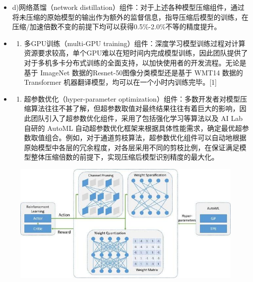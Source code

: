 \begin{itemize}
\begin{enumerate}
  \end{enumerate}
\item
  d)网络蒸馏（network
  distillation）组件：对于上述各种模型压缩组件，通过将未压缩的原始模型的输出作为额外的监督信息，指导压缩后模型的训练，在压缩/加速倍数不变的前提下均可以获得0.5\%-2.0\%不等的精度提升。
\item
  \begin{enumerate}
  \def\labelenumi{\alph{enumi})}
  \setcounter{enumi}{4}
  \item
    多GPU训练（multi-GPU
    training）组件：深度学习模型训练过程对计算资源要求较高，单个GPU难以在短时间内完成模型训练，因此团队提供了对于多机多卡分布式训练的全面支持，以加快使用者的开发流程。无论是基于
    ImageNet 数据的Resnet-50图像分类模型还是基于 WMT14 数据的
    Transformer 机器翻译模型，均可以在一个小时内训练完毕。{[}1{]}
  \end{enumerate}
\item
  \begin{enumerate}
  \def\labelenumi{\alph{enumi})}
  \setcounter{enumi}{5}
  \item
    超参数优化（hyper-parameter
    optimization）组件：多数开发者对模型压缩算法往往不甚了解，但超参数取值对最终结果往往有着巨大的影响，因此团队引入了超参数优化组件，采用了包括强化学习等算法以及
    AI Lab 自研的 AutoML
    自动超参数优化框架来根据具体性能需求，确定最优超参数取值组合。例如，对于通道剪枝算法，超参数优化组件可以自动地根据原始模型中各层的冗余程度，对各层采用不同的剪枝比例，在保证满足模型整体压缩倍数的前提下，实现压缩后模型识别精度的最大化。
  \end{enumerate}
\end{itemize}

\begin{figure}
\centering
\includegraphics{./img/ch17/packflow1.jpg}
\caption{}
\end{figure}

